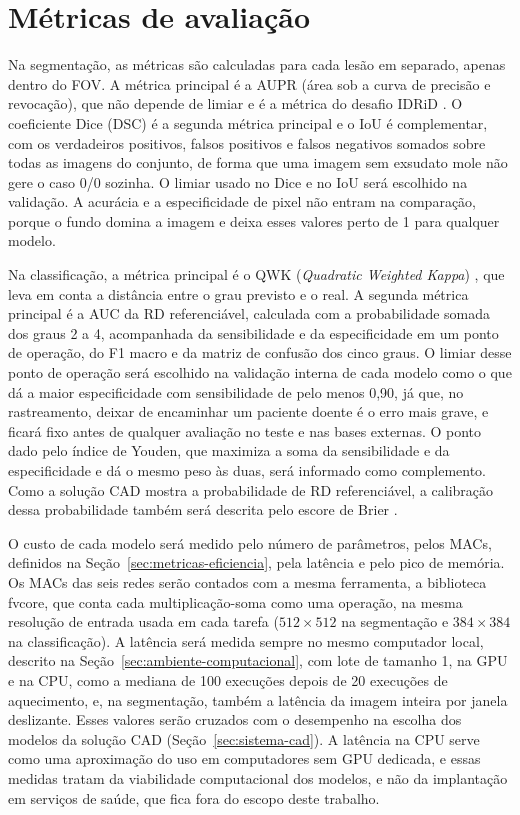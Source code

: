 \section{Métricas de avaliação}
\label{sec:met-metricas}

Na segmentação, as métricas são calculadas para cada lesão em separado, apenas dentro do FOV. A métrica principal é a AUPR (área sob a curva de precisão e revocação), que não depende de limiar e é a métrica do desafio IDRiD \cite{porwal2020idrid}. O coeficiente Dice (DSC) é a segunda métrica principal e o IoU é complementar, com os verdadeiros positivos, falsos positivos e falsos negativos somados sobre todas as imagens do conjunto, de forma que uma imagem sem exsudato mole não gere o caso 0/0 sozinha. O limiar usado no Dice e no IoU será escolhido na validação. A acurácia e a especificidade de pixel não entram na comparação, porque o fundo domina a imagem e deixa esses valores perto de 1 para qualquer modelo.

Na classificação, a métrica principal é o QWK (\textit{Quadratic Weighted Kappa}) \cite{cohen1968kappa}, que leva em conta a distância entre o grau previsto e o real. A segunda métrica principal é a AUC da RD referenciável, calculada com a probabilidade somada dos graus 2 a 4, acompanhada da sensibilidade e da especificidade em um ponto de operação, do F1 macro e da matriz de confusão dos cinco graus. O limiar desse ponto de operação será escolhido na validação interna de cada modelo como o que dá a maior especificidade com sensibilidade de pelo menos 0,90, já que, no rastreamento, deixar de encaminhar um paciente doente é o erro mais grave, e ficará fixo antes de qualquer avaliação no teste e nas bases externas. O ponto dado pelo índice de Youden, que maximiza a soma da sensibilidade e da especificidade e dá o mesmo peso às duas, será informado como complemento. Como a solução CAD mostra a probabilidade de RD referenciável, a calibração dessa probabilidade também será descrita pelo escore de Brier \cite{brier1950verification}.

O custo de cada modelo será medido pelo número de parâmetros, pelos MACs, definidos na Seção~\ref{sec:metricas-eficiencia}, pela latência e pelo pico de memória. Os MACs das seis redes serão contados com a mesma ferramenta, a biblioteca fvcore, que conta cada multiplicação-soma como uma operação, na mesma resolução de entrada usada em cada tarefa ($512 \times 512$ na segmentação e $384 \times 384$ na classificação). A latência será medida sempre no mesmo computador local, descrito na Seção~\ref{sec:ambiente-computacional}, com lote de tamanho 1, na GPU e na CPU, como a mediana de 100 execuções depois de 20 execuções de aquecimento, e, na segmentação, também a latência da imagem inteira por janela deslizante. Esses valores serão cruzados com o desempenho na escolha dos modelos da solução CAD (Seção~\ref{sec:sistema-cad}). A latência na CPU serve como uma aproximação do uso em computadores sem GPU dedicada, e essas medidas tratam da viabilidade computacional dos modelos, e não da implantação em serviços de saúde, que fica fora do escopo deste trabalho.

